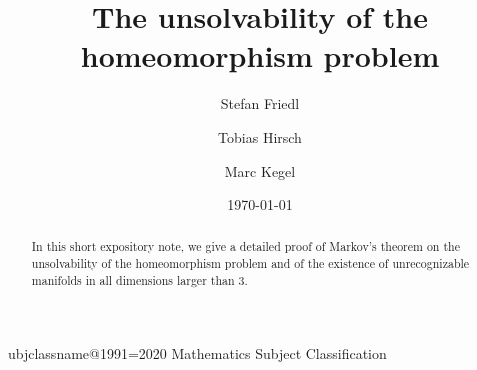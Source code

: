 \documentclass[a4paper, reqno]{amsart}
\theoremstyle{definition}
\theoremstyle{remark}
\newcommand{\R}{\mathbb{R}}
\newcommand{\comm}[2]{%
  {\color{red}#1: #2}}
\renewcommand{\~}{\nobreak\ }
\begin{document}
\title{The unsolvability of the homeomorphism problem}


\author{Stefan Friedl}
\author{Tobias Hirsch}
\author{Marc Kegel}


\address{Fakult\"at f\"ur Mathematik, Universit\"at Regensburg, Germany}

\address{Universidad de Sevilla, Dpto.\ de Álgebra,
Avda.\ Reina Mercedes s/n,
41012 Sevilla, Spain}



\def\subjclassname{\textup{2020} Mathematics Subject Classification}
\expandafter\let\csname subjclassname@1991\endcsname=\subjclassname


\date{\today} %

\begin{abstract}
In this short expository note, we give a detailed proof of Markov’s theorem on the unsolvability of the homeomorphism problem and of the existence of unrecognizable manifolds in all dimensions larger than $3$. 
\end{abstract}

\maketitle





\end{document}
